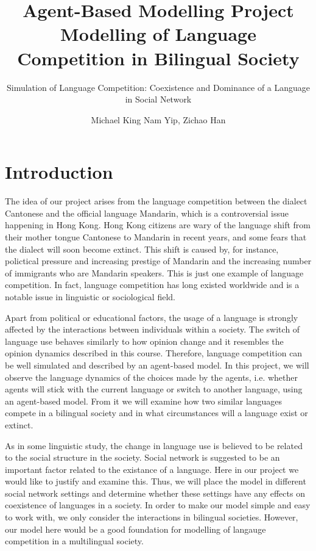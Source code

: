 \documentclass[a4paper, 11pt]{article}
\title{Agent-Based Modelling Project\\
Modelling of Language Competition in Bilingual Society}
\author{Simulation of Language Competition: Coexistence and Dominance of a Language in Social Network}
\author{Michael King Nam Yip, Zichao Han}
\date{}
\begin{document}
\maketitle
\section{Introduction}
The idea of our project arises from the language competition between the dialect Cantonese and the official language Mandarin, which is a controversial issue happening in Hong Kong. \cite{WinNT} Hong Kong citizens are wary of the language shift from their mother tongue Cantonese to Mandarin in recent years, and some fears that the dialect will soon become extinct. This shift is caused by, for instance, polictical pressure and increasing prestige of Mandarin and the increasing number of immigrants who are Mandarin speakers. This is just one example of language competition. In fact, language competition has long existed worldwide and is a notable issue in linguistic or sociological field. 

Apart from political or educational factors, the usage of a language is strongly affected by the interactions between individuals within a society. \cite{patriarca2012modeling} The switch of language use behaves similarly to how opinion change and it resembles the opinion dynamics described in this course. Therefore, language competition can be well simulated and described by an agent-based model. In this project, we will observe the language dynamics of the choices made by the agents, i.e. whether agents will stick with the current language or switch to another language, using an agent-based model. From it we will examine how two similar languages compete in a bilingual society and in what circumstances will a language exist or extinct. 

As in some linguistic study, the change in language use is believed to be related to the social structure in the society. Social network is suggested to be an important factor related to the existance of a language\cite{castello2008modelling}. Here in our project we would like to justify and examine this. Thus, we will place the model in different social network settings and determine whether these settings have any effects on coexistence of languages in a society. In order to make our model simple and easy to work with, we only consider the interactions in bilingual societies. However, our model here would be a good foundation for modelling of langauge competition in a multilingual society.
\end{document}
